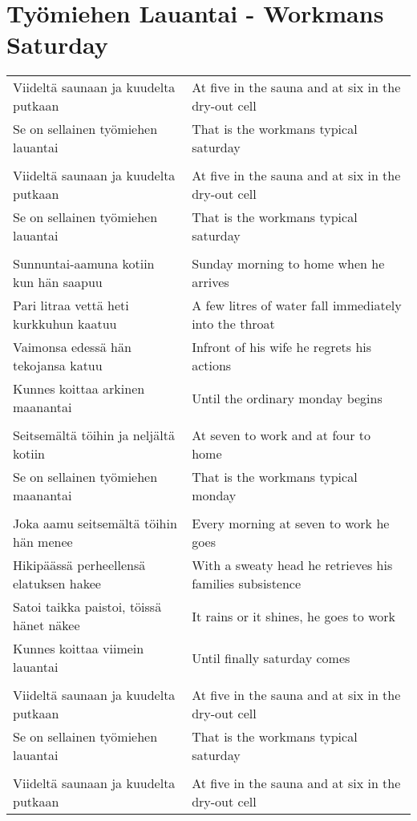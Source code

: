 \documentclass[12pt,a4paper]{article}
\begin{document}
\section{Työmiehen Lauantai - Workmans Saturday}

\centering
\begin{tabular}{ll}
Viideltä saunaan ja kuudelta putkaan & At five in the sauna and at six in the dry-out cell \\
Se on sellainen työmiehen lauantai & That is the workmans typical saturday \\
& \\
Viideltä saunaan ja kuudelta putkaan & At five in the sauna and at six in the dry-out cell \\
Se on sellainen työmiehen lauantai & That is the workmans typical saturday \\
\\
Sunnuntai-aamuna kotiin kun hän saapuu & Sunday morning to home when he arrives \\
Pari litraa vettä heti kurkkuhun kaatuu & A few  litres of water fall immediately into the throat \\
Vaimonsa edessä hän tekojansa katuu & Infront of his wife he regrets his actions \\
Kunnes koittaa arkinen maanantai & Until the ordinary monday begins \\
\\
Seitsemältä töihin ja neljältä kotiin & At seven to work and at four to home \\
Se on sellainen työmiehen maanantai & That is the workmans typical monday \\
\\
Joka aamu seitsemältä töihin hän menee & Every morning at seven to work he goes \\
Hikipäässä perheellensä elatuksen hakee & With a sweaty head he retrieves his families subsistence \\
Satoi taikka paistoi, töissä hänet näkee & It rains or it shines, he goes to work \\
Kunnes koittaa viimein lauantai & Until finally saturday comes \\
\\
Viideltä saunaan ja kuudelta putkaan & At five in the sauna and at six in the dry-out cell \\
Se on sellainen työmiehen lauantai & That is the workmans typical saturday \\
\\
Viideltä saunaan ja kuudelta putkaan & At five in the sauna and at six in the dry-out cell \\

\end{tabular}
\end{document}
